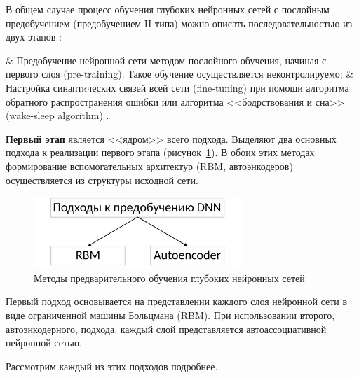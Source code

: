 В общем случае процесс обучения глубоких нейронных сетей с послойным предобучением (предобучением II типа) можно описать последовательностью из двух этапов \cite{n1, n2, n3, n4}: 
\begin{easylistNum}
	& Предобучение нейронной сети методом послойного обучения, начиная с первого слоя  (pre-training). Такое обучение осуществляется неконтролируемо;
	& Настройка синаптических связей всей сети (fine-tuning) при помощи алгоритма обратного распространения ошибки или алгоритма <<бодрствования и сна>> (wake-sleep algorithm) \cite{hinton1995}.
\end{easylistNum}


\textbf{Первый этап} является <<ядром>> всего подхода.
Выделяют два основных подхода к реализации первого этапа (рисунок~\ref{fig:pic1_2}). %
В обоих этих методах формирование вспомогательных архитектур (RBM, автоэнкодеров) осуществляется из структуры исходной сети. 

\begin{figure}[H]
  \centering
  \includegraphics[width=0.7\textwidth]{man-source/images/ch1/pic1-2.pdf}
  \caption{Методы предварительного обучения глубоких нейронных сетей}
  \label{fig:pic1_2}
\end{figure}

Первый подход основывается на представлении каждого слоя нейронной сети в виде ограниченной машины Больцмана (RBM). При использовании второго, автоэнкодерного, подхода, каждый слой  представляется автоассоциативной нейронной сетью.

Рассмотрим каждый из этих подходов подробнее.

\def\slantfrac#1#2{ \hspace{3pt}\!^{#1}\!\!\hspace{1pt}/
  \hspace{2pt}\!\!_{#2}\!\hspace{3pt}
}

